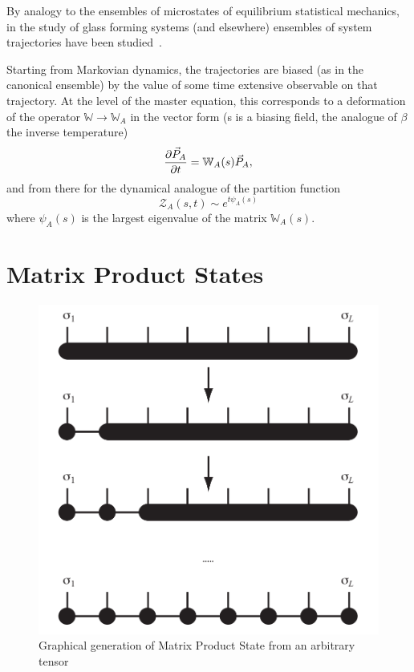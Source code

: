 \documentclass[final]{beamer}
\begin{document}
\begin{frame}[t]
\begin{multicols}{3}
By analogy to the ensembles of microstates of equilibrium statistical mechanics, in the study of glass forming systems (and elsewhere) ensembles of system trajectories have been studied~\cite{Garrahan2009}.

Starting from Markovian dynamics, the trajectories are biased (as in the canonical ensemble) by the value of some time extensive observable on that trajectory.
At the level of the master equation, this corresponds to a deformation of the operator $\mathbb{W} \rightarrow \mathbb{W}_A$ in the vector form (s is a biasing field, the analogue of $\beta$ the inverse temperature)
\begin{equation}
    \pdv{\vec{P}_A}{t} = \mathbb{W}_A(s) \vec{P}_A,
\end{equation}
and from there for the dynamical analogue of the partition function
\begin{equation}
    \mathcal{Z}_A(s, t) \sim e^{t \psi_A(s)}
\end{equation}
where $\psi_A(s)$ is the largest eigenvalue of the matrix $\mathbb{W}_A(s)$.

\section{Matrix Product States}

\begin{figure}[h]
\includegraphics[width=\linewidth]{mps_gen}
\caption{Graphical generation of Matrix Product State from an arbitrary tensor\cite{Schollwock2011}\cite{Orus2014}}
\end{figure}


\end{multicols}
\end{frame}
\end{document}

